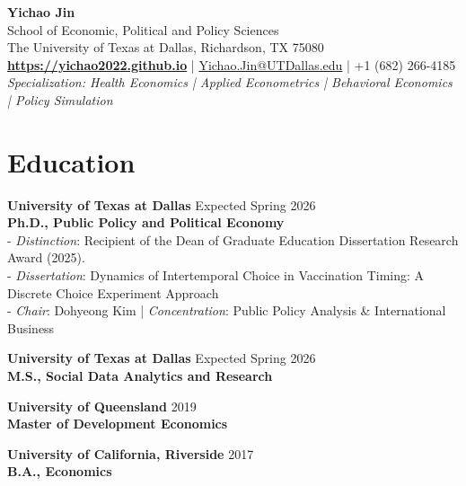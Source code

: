 \documentclass[11pt]{article}
\begin{document}
\begin{center}
    {\huge \textbf{Yichao Jin}} \\
    \vspace{0.5em}
    School of Economic, Political and Policy Sciences \\
    The University of Texas at Dallas, Richardson, TX 75080 \\
    \vspace{0.5em}
    \href{https://yichao2022.github.io}{\textbf{https://yichao2022.github.io}} \quad | \quad \href{mailto:Yichao.Jin@UTDallas.edu}{Yichao.Jin@UTDallas.edu} \quad | \quad +1 (682) 266-4185 \\
    \vspace{0.5em}
    \textit{Specialization: Health Economics | Applied Econometrics | Behavioral Economics | Policy Simulation}
\end{center}

\vspace{0.5em}
\noindent\hrulefill

\section*{Education}
\textbf{University of Texas at Dallas} \hfill Expected Spring 2026 \\
\textbf{Ph.D., Public Policy and Political Economy} \\
- \textit{Distinction}: Recipient of the Dean of Graduate Education Dissertation Research Award (2025). \\
- \textit{Dissertation}: Dynamics of Intertemporal Choice in Vaccination Timing: A Discrete Choice Experiment Approach \\
- \textit{Chair}: Dohyeong Kim \quad | \quad \textit{Concentration}: Public Policy Analysis \& International Business

\vspace{0.5em}
\noindent \textbf{University of Texas at Dallas} \hfill Expected Spring 2026 \\
\textbf{M.S., Social Data Analytics and Research}

\vspace{0.5em}
\noindent \textbf{University of Queensland} \hfill 2019 \\
\textbf{Master of Development Economics}

\vspace{0.5em}
\noindent \textbf{University of California, Riverside} \hfill 2017 \\
\textbf{B.A., Economics}
\end{document}
